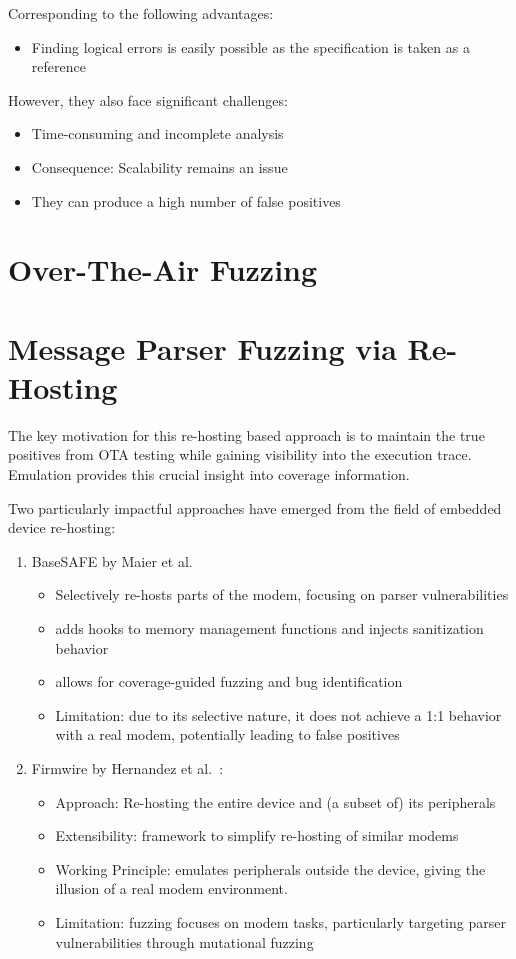 Corresponding to the following advantages:
\begin{itemize}
  \item Finding logical errors is easily possible as the specification is taken as a reference
\end{itemize}
However, they also face significant challenges:
\begin{itemize}
  \item Time-consuming and incomplete analysis
  \item Consequence: Scalability remains an issue
  \item They can produce a high number of false positives
\end{itemize}

\section{Over-The-Air Fuzzing}

\section{Message Parser Fuzzing via Re-Hosting}


The key motivation for this re-hosting based approach is to maintain the true positives from OTA testing while gaining visibility into the execution trace.
Emulation provides this crucial insight into coverage information.

Two particularly impactful approaches have emerged from the field of embedded device re-hosting:
\begin{enumerate}
  \item BaseSAFE by Maier et al.~\cite{Maier2020}
    \begin{itemize}
      \item Selectively re-hosts parts of the modem, focusing on parser vulnerabilities
      \item adds hooks to memory management functions and injects sanitization behavior
      \item allows for coverage-guided fuzzing and bug identification
      \item Limitation: due to its selective nature, it does not achieve a 1:1 behavior with a real modem, potentially leading to false positives
    \end{itemize}
  \item Firmwire by Hernandez et al.~\cite{Hernandez2022}:
    \begin{itemize}
      \item Approach: Re-hosting the entire device and (a subset of) its peripherals
      \item Extensibility: framework to simplify re-hosting of similar modems
      \item Working Principle: emulates peripherals outside the device, giving the illusion of a real modem environment.
      \item Limitation: fuzzing focuses on modem tasks, particularly targeting parser vulnerabilities through mutational fuzzing
    \end{itemize}
\end{enumerate}

